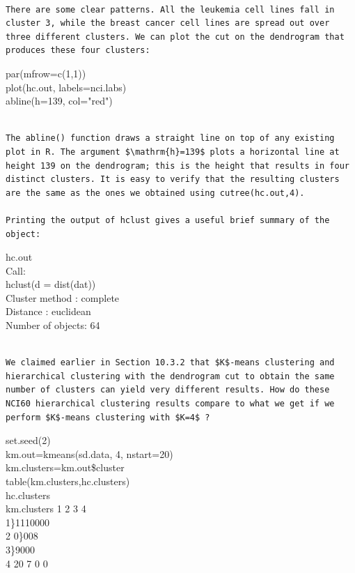 \documentclass[10pt]{article}
\begin{document}
\begin{verbatim}

There are some clear patterns. All the leukemia cell lines fall in cluster 3, while the breast cancer cell lines are spread out over three different clusters. We can plot the cut on the dendrogram that produces these four clusters:
\end{verbatim}

\begin{displayquote}
par(mfrow=c(1,1))\\
plot(hc.out, labels=nci.labs)\\
abline(h=139, col="red")
\end{displayquote}

\begin{verbatim}

The abline() function draws a straight line on top of any existing plot in R. The argument $\mathrm{h}=139$ plots a horizontal line at height 139 on the dendrogram; this is the height that results in four distinct clusters. It is easy to verify that the resulting clusters are the same as the ones we obtained using cutree(hc.out,4).

Printing the output of hclust gives a useful brief summary of the object:
\end{verbatim}

\begin{displayquote}
hc.out\\
Call:\\
hclust(d = dist(dat))\\
Cluster method : complete\\
Distance : euclidean\\
Number of objects: 64
\end{displayquote}

\begin{verbatim}

We claimed earlier in Section 10.3.2 that $K$-means clustering and hierarchical clustering with the dendrogram cut to obtain the same number of clusters can yield very different results. How do these NCI60 hierarchical clustering results compare to what we get if we perform $K$-means clustering with $K=4$ ?
\end{verbatim}

\begin{displayquote}
set.seed(2)\\
km.out=kmeans(sd.data, 4, nstart=20)\\
km.clusters=km.out\$cluster\\
table(km.clusters,hc.clusters)\\
hc.clusters\\
km.clusters 1 2 3 4\\
1\}1110000\\
2 0\}008\\
3\}9000\\
4 20 7 0 0
\end{displayquote}
\end{document}

